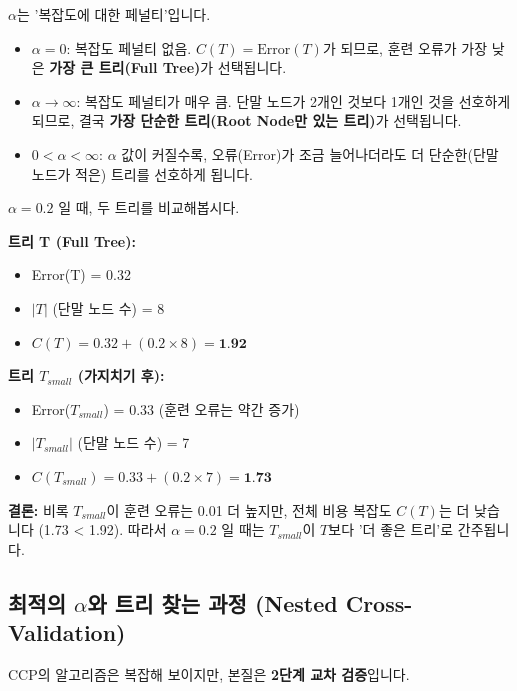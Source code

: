 \documentclass[11pt,a4paper]{book}
\theoremstyle{definition}
\begin{document}
$\alpha$는 '복잡도에 대한 페널티'입니다.
\begin{itemize}
    \item $\alpha = 0$: 복잡도 페널티 없음. $C(T) = \text{Error}(T)$가 되므로, 훈련 오류가 가장 낮은 \textbf{가장 큰 트리(Full Tree)}가 선택됩니다.
    \item $\alpha \rightarrow \infty$: 복잡도 페널티가 매우 큼. 단말 노드가 2개인 것보다 1개인 것을 선호하게 되므로, 결국 \textbf{가장 단순한 트리(Root Node만 있는 트리)}가 선택됩니다.
    \item $0 < \alpha < \infty$: $\alpha$ 값이 커질수록, 오류(Error)가 조금 늘어나더라도 더 단순한(단말 노드가 적은) 트리를 선호하게 됩니다.
\end{itemize}

\begin{boxExample}
    $\alpha = 0.2$ 일 때, 두 트리를 비교해봅시다.
    
    \textbf{트리 T (Full Tree):}
    \begin{itemize}
        \item Error(T) = 0.32
        \item $|T|$ (단말 노드 수) = 8
        \item $C(T) = 0.32 + (0.2 \times 8) = \textbf{1.92}$
    \end{itemize}
    
    \textbf{트리 $T_{small}$ (가지치기 후):}
    \begin{itemize}
        \item Error($T_{small}$) = 0.33 (훈련 오류는 약간 증가)
        \item $|T_{small}|$ (단말 노드 수) = 7
        \item $C(T_{small}) = 0.33 + (0.2 \times 7) = \textbf{1.73}$
    \end{itemize}
    
    \textbf{결론:}
    비록 $T_{small}$이 훈련 오류는 0.01 더 높지만, 전체 비용 복잡도 $C(T)$는 더 낮습니다 (1.73 < 1.92).
    따라서 $\alpha=0.2$ 일 때는 $T_{small}$이 $T$보다 '더 좋은 트리'로 간주됩니다.
\end{boxExample}

\subsection{최적의 $\alpha$와 트리 찾는 과정 (Nested Cross-Validation)}

CCP의 알고리즘은 복잡해 보이지만, 본질은 \textbf{2단계 교차 검증}입니다.
\end{document}
